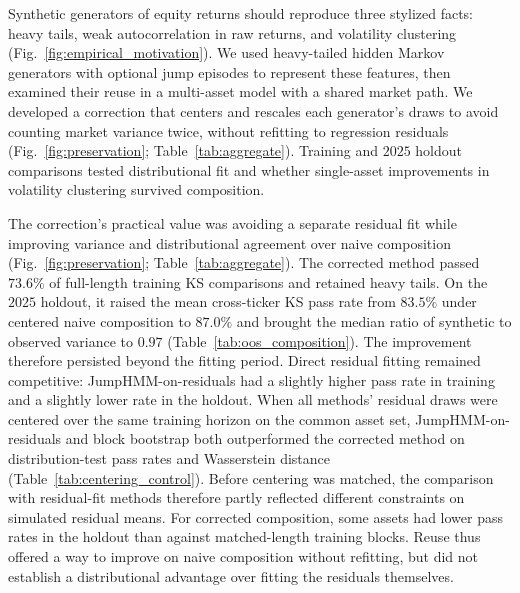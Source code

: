 Synthetic generators of equity returns should reproduce three
stylized facts: heavy tails, weak autocorrelation in raw returns, and
volatility clustering (Fig.~\ref{fig:empirical_motivation}). We used
heavy-tailed hidden Markov generators with optional jump episodes to
represent these features, then examined their reuse in a multi-asset
model with a shared market path. We developed a correction that
centers and rescales each generator's draws to avoid counting market
variance twice, without refitting to regression residuals
(Fig.~\ref{fig:preservation}; Table~\ref{tab:aggregate}). Training and
$2025$ holdout comparisons tested distributional fit and whether
single-asset improvements in volatility clustering survived
composition.

The correction's practical value was avoiding a separate residual
fit while improving variance and distributional agreement over naive
composition (Fig.~\ref{fig:preservation};
Table~\ref{tab:aggregate}). The corrected method passed $73.6\%$ of
full-length training KS comparisons and retained heavy tails. On the
$2025$ holdout, it raised the mean cross-ticker KS pass rate from
$83.5\%$ under centered naive composition to $87.0\%$ and brought
the median ratio of synthetic to observed variance to $0.97$
(Table~\ref{tab:oos_composition}). The improvement therefore
persisted beyond the fitting period. Direct residual fitting remained
competitive: JumpHMM-on-residuals had a slightly higher pass rate in
training and a slightly lower rate in the holdout. When all methods'
residual draws were centered over the same training horizon on the
common asset set, JumpHMM-on-residuals and block bootstrap both
outperformed the corrected method on distribution-test pass rates and
Wasserstein distance (Table~\ref{tab:centering_control}). Before centering was matched, the comparison with residual-fit
methods therefore partly reflected different constraints on simulated
residual means. For corrected composition, some assets had lower pass rates in the
holdout than against matched-length training blocks. Reuse thus offered a way to improve
on naive composition without refitting, but did not establish a
distributional advantage over fitting the residuals themselves.

